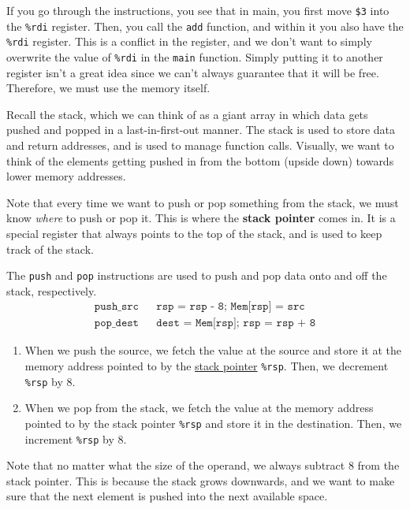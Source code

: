   If you go through the instructions, you see that in main, you first move \texttt{\$3} into the \texttt{\%rdi} register. Then, you call the \texttt{add} function, and within it you also have the \texttt{\%rdi} register. This is a conflict in the register, and we don't want to simply overwrite the value of \texttt{\%rdi} in the \texttt{main} function. Simply putting it to another register isn't a great idea since we can't always guarantee that it will be free. Therefore, we must use the memory itself. 

  Recall the stack, which we can think of as a giant array in which data gets pushed and popped in a last-in-first-out manner. The stack is used to store data and return addresses, and is used to manage function calls. Visually, we want to think of the elements getting pushed in from the bottom (upside down) towards lower memory addresses. 

  \begin{definition}
    \label{def:stack-pointer}
    Note that every time we want to push or pop something from the stack, we must know \textit{where} to push or pop it. This is where the \textbf{stack pointer} comes in. It is a special register that always points to the top of the stack, and is used to keep track of the stack.
  \end{definition}

  \begin{definition}
    \label{def:push-and-pop}
    The \texttt{push} and \texttt{pop} instructions are used to push and pop data onto and off the stack, respectively. 
    \begin{align*}
      \texttt{push\_ src} && \texttt{rsp = rsp - 8; Mem[rsp] = src} \\
      \texttt{pop\_ dest} && \texttt{dest = Mem[rsp]; rsp = rsp + 8} 
    \end{align*}
    \begin{enumerate}
      \item When we push the source, we fetch the value at the source and store it at the memory address pointed to by the \hyperref[def:stack-pointer]{stack pointer} \texttt{\%rsp}. Then, we decrement \texttt{\%rsp} by 8.
      \item When we pop from the stack, we fetch the value at the memory address pointed to by the stack pointer \texttt{\%rsp} and store it in the destination. Then, we increment \texttt{\%rsp} by 8.
    \end{enumerate}
    Note that no matter what the size of the operand, we always subtract 8 from the stack pointer. This is because the stack grows downwards, and we want to make sure that the next element is pushed into the next available space.
  \end{definition}

